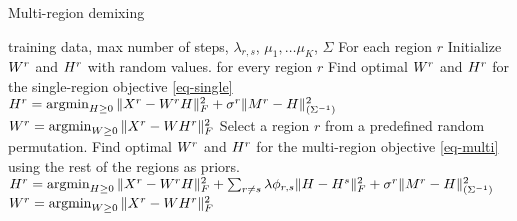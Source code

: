\begin{algorithm}[tbh]
   \caption{Multi-region demixing}
   \label{alg:multimix}
   \begin{algorithmic}[1]
    training data, max number of steps, $\lambda_{r,s}$, $\mu_1,\ldots\mu_K$, $\Sigma$
    For each region $r$
   \STATE \quad Initialize $W^r$ and ${H}^r$ with random values.
    for every region $r$ 
   \STATE \quad Find optimal $W^r$ and ${H}^r$ for the single-region objective \eqref{eq-single}
   \STATE \quad $H^r = \argmin_{H \geq 0 } \| X^r - W^rH\|^2_F +  \sigma^r \| M^r - \H \|^2_{(\Sigma^{-1})} $
   \STATE \quad $ W^r = \argmin_{W \geq 0} \| X^r - WH^r\|^2_F $
   \REPEAT
   \STATE Select a region $r$ from a predefined random permutation.
   \STATE Find optimal $W^r$ and ${H}^r$ for the multi-region objective \eqref{eq-multi} using the rest of the regions as priors.
   \STATE  $H^r = \argmin_{H \geq 0 } \| X^r - W^rH\|^2_F + \sum_{r \neq s} \lambda \phi_{r , s} \| \H - \H^s \|_F^2  + \sigma^r \| M^r - \H \|^2_{(\Sigma^{-1})} $
   \STATE  $ W^r = \argmin_{W \geq 0} \| X^r - WH^r\|^2_F $
\end{algorithmic}
\end{algorithm}


